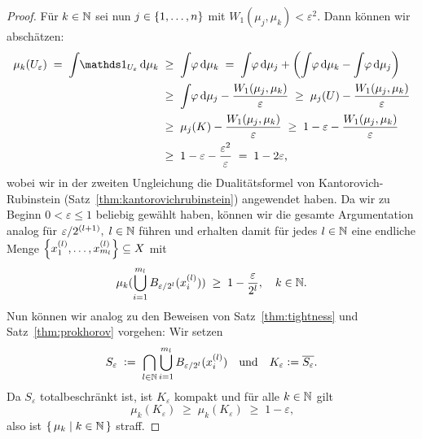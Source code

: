 \documentclass[../main/main.tex]{subfiles}
\begin{document}
\begin{proof}
		Für  $k \in \mathbb{N}$ sei nun $j \in \left\{1, \dots, n\right\}$ mit $W_1(\mu_j, \mu_k) < \varepsilon^2$. Dann können wir abschätzen:
		\begin{align*}
			\mu_k(U_\varepsilon) \; = \; \measureint{}{\indfct_{U_\varepsilon}}{\mu_k} \; &\geq \; \measureint{}{\varphi}{\mu_k} \; = \; \measureint{}{\varphi}{\mu_j} + \left( \measureint{}{\varphi}{\mu_k} - \measureint{}{\varphi}{\mu_j} \right) \\
			                                                                              &\geq \; \measureint{}{\varphi}{\mu_j} - \frac{W_1(\mu_j, \mu_k)}{\varepsilon} \; \geq \; \mu_j(U) - \frac{W_1(\mu_j, \mu_k)}{\varepsilon} \\
			                                                                              &\geq \; \mu_j(K) - \frac{W_1(\mu_j, \mu_k)}{\varepsilon} \; \geq \; 1 - \varepsilon - \frac{W_1(\mu_j, \mu_k)}{\varepsilon} \\
			                                                                              &\geq \; 1 - \varepsilon - \frac{\varepsilon^2}{\varepsilon} \; = \; 1 - 2\varepsilon \text{,}
		\end{align*}
		wobei wir in der zweiten Ungleichung die Dualitätsformel von Kantorovich-Rubinstein (Satz~\ref{thm:kantorovichrubinstein}) angewendet haben.
		Da wir zu Beginn $0 < \varepsilon \leq 1$ beliebig gewählt haben, können wir die gesamte Argumentation analog für $\varepsilon/2^{(l+1)}, \; l \in \mathbb{N}$ führen und erhalten damit für jedes $l \in \mathbb{N}$ 
		eine endliche Menge $\left\{x_1^{(l)}, \dots, x_{m_l}^{(l)}\right\} \subseteq X$ mit
		\[ \mu_k(\bigcup_{i=1}^{m_l} B_{\varepsilon/2^l}(x_i^{(l)})) \; \geq \; 1 - \frac{\varepsilon}{2^l}, \quad k \in \mathbb{N} \text{.} \]
		Nun können wir analog zu den Beweisen von Satz~\ref{thm:tightness} und Satz~\ref{thm:prokhorov} vorgehen:
		Wir setzen
		\[ S_{\varepsilon} \; \vcentcolon = \; \bigcap_{l \in \mathbb{N}} \bigcup_{i=1}^{m_l} B_{\varepsilon/2^l}(x_i^{(l)}) \quad \text{und} \quad K_{\varepsilon} \vcentcolon = \overline{S_\varepsilon} \text{.} \]
		Da $S_{\varepsilon}$ totalbeschränkt ist, ist $K_{\varepsilon}$ kompakt und für alle $k \in \mathbb{N}$ gilt
		\[ \mu_k(K_{\varepsilon}) \; \geq \; \mu_k(K_{\varepsilon}) \; \geq \; 1 - \varepsilon \text{,} \]
		also ist $\left\{\, \mu_k \; \middle| \; k \in \mathbb{N} \,\right\}$ straff.
	\end{proof}
\end{document}
